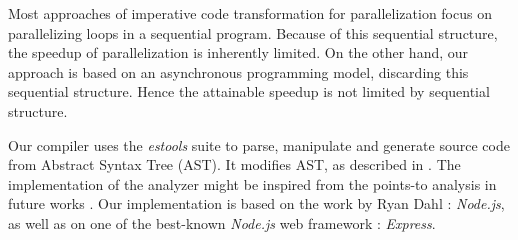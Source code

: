 Most approaches of imperative code transformation for parallelization focus on parallelizing loops in a sequential program. %
Because of this sequential structure, the speedup of parallelization is inherently limited.
On the other hand, our approach is based on an asynchronous programming model, discarding this sequential structure.
Hence the attainable speedup is not limited by sequential structure.



Our compiler uses the \textit{estools} suite to parse, manipulate and generate source code from Abstract Syntax Tree (AST).
It modifies AST, as described in \cite{Jones2003}.
The implementation of the analyzer might be inspired from the points-to analysis in future works \cite{Wei2014}.
Our implementation is based on the work by Ryan Dahl : \textit{Node.js}, as well as on one of the best-known \textit{Node.js} web framework : \textit{Express}.